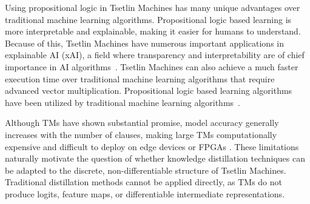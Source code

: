 \documentclass[sn-mathphys-num]{sn-jnl}%
\theoremstyle{thmstyleone}%
\theoremstyle{thmstyletwo}%
\theoremstyle{thmstylethree}%
\begin{document}
Using propositional logic in Tsetlin Machines has many unique advantages over traditional machine learning algorithms. Propositional logic based learning is more interpretable and explainable, making it easier for humans to understand. Because of this, Tsetlin Machines have numerous important applications in explainable AI (xAI), a field where transparency and interpretability are of chief importance in AI algorithms~\cite{xu2019explainable,dovsilovic2018explainable}. Tsetlin Machines can also achieve a much faster execution time over traditional machine learning algorithms that require advanced vector multiplication. Propositional logic based learning algorithms have been utilized by traditional machine learning algorithms~\cite{anjum2022localization, anjumlocalization}.

Although TMs have shown substantial promise, model accuracy generally increases with the number of clauses, making large TMs computationally expensive and difficult to deploy on edge devices or FPGAs \cite{zhang2021low}. These limitations naturally motivate the question of whether knowledge distillation techniques can be adapted to the discrete, non-differentiable structure of Tsetlin Machines. Traditional distillation methods cannot be applied directly, as TMs do not produce logits, feature maps, or differentiable intermediate representations.
\end{document}
